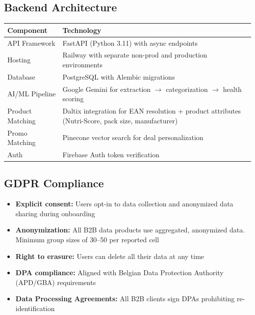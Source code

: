 \documentclass[11pt,a4paper]{article}
\begin{document}
\subsection{Backend Architecture}

\begin{center}
\renewcommand{\arraystretch}{1.3}
\begin{tabularx}{\textwidth}{L{3.5cm} L{10cm}}
\toprule
{}
\textbf{\color{white}Component} & \textbf{\color{white}Technology} \\
\midrule
API Framework & FastAPI (Python 3.11) with async endpoints \\
Hosting & Railway with separate non-prod and production environments \\
Database & PostgreSQL with Alembic migrations \\
AI/ML Pipeline & Google Gemini for extraction $\rightarrow$ categorization $\rightarrow$ health scoring \\
Product Matching & Daltix integration for EAN resolution + product attributes (Nutri-Score, pack size, manufacturer) \\
Promo Matching & Pinecone vector search for deal personalization \\
Auth & Firebase Auth token verification \\
\bottomrule
\end{tabularx}
\end{center}

\subsection{GDPR Compliance}

\begin{itemize}[leftmargin=1.5em, itemsep=3pt]
  \item \textbf{Explicit consent:} Users opt-in to data collection and anonymized data sharing during onboarding
  \item \textbf{Anonymization:} All B2B data products use aggregated, anonymized data. Minimum group sizes of 30--50 per reported cell
  \item \textbf{Right to erasure:} Users can delete all their data at any time
  \item \textbf{DPA compliance:} Aligned with Belgian Data Protection Authority (APD/GBA) requirements
  \item \textbf{Data Processing Agreements:} All B2B clients sign DPAs prohibiting re-identification
\end{itemize}
\end{document}
